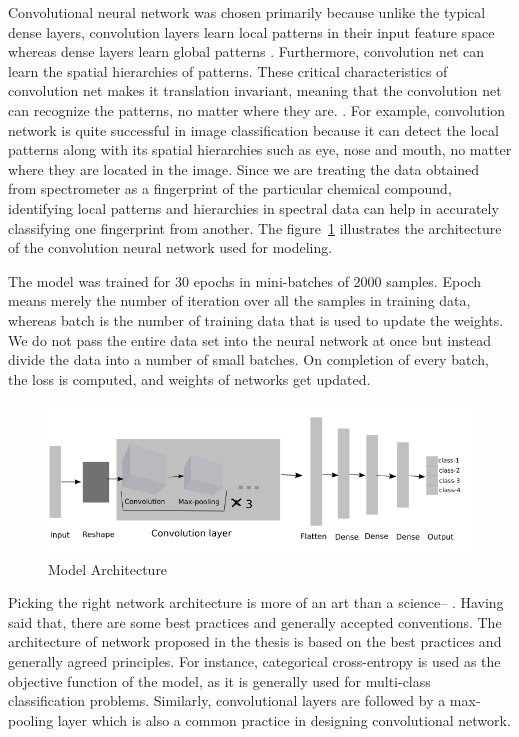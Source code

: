 Convolutional neural network was chosen primarily because unlike the typical dense layers, convolution layers learn local patterns in their input feature space whereas dense layers learn global patterns \citep{chollet2017deep}. Furthermore, convolution net can learn the spatial hierarchies of patterns. These critical characteristics of convolution net makes it translation invariant, meaning that the convolution net can recognize the patterns, no matter where they are. \citep{chollet2017deep}. For example, convolution network is quite successful in image classification because it can detect the local patterns along with its spatial hierarchies such as eye, nose and mouth, no matter where they are located in the image. Since we are treating the data obtained from spectrometer as a fingerprint of the particular chemical compound, identifying local patterns and hierarchies in spectral data can help in accurately classifying one fingerprint from another. The figure~\ref{fig:Convolution model} illustrates the architecture of the convolution neural network used for modeling. 

The model was trained for 30 epochs in mini-batches of 2000 samples. Epoch means merely the number of iteration over all the samples in training data, whereas batch is the number of training data that is used to update the weights. We do not pass the entire data set into the neural network at once but instead divide the data into a number of small batches. On completion of every batch, the loss is computed, and weights of networks get updated.


\begin{figure}[ht]
	\begin{center}
		\includegraphics[width=\textwidth]{images/neural.png}
		\caption{Model Architecture}
		\label{fig:Convolution model}
	\end{center}
\end{figure}

Picking the right network architecture is more of an art than a science-- \citep{chollet2017deep}. Having said that, there are some best practices and generally accepted conventions. The architecture of network proposed in the thesis is based on the best practices and generally agreed principles. For instance, categorical cross-entropy is used as the objective function of the model, as it is generally used for multi-class classification problems. Similarly, convolutional layers are followed by a max-pooling layer which is also a common practice in designing convolutional network. 

